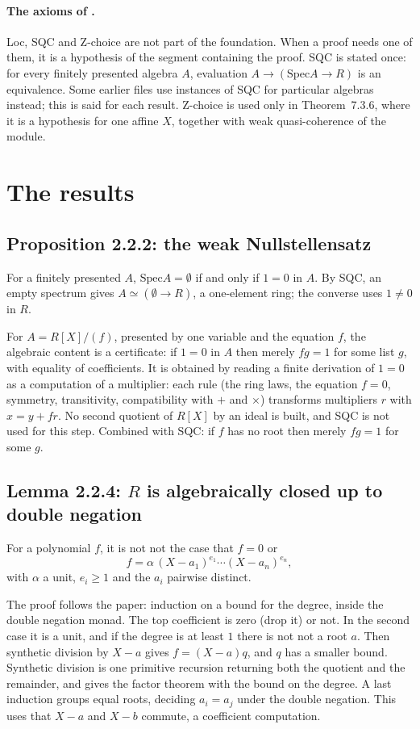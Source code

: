\documentclass[11pt]{article}
\newcommand{\Spec}{\mathrm{Spec}}
\theoremstyle{remark}
\begin{document}
\paragraph{The axioms of \cite{SAG}.} Loc, SQC and Z-choice are not
part of the foundation. When a proof needs one of them, it is a
hypothesis of the segment containing the proof. SQC is stated once: for
every finitely presented algebra $A$, evaluation
$A\to(\Spec A\to R)$ is an equivalence. Some earlier files use
instances of SQC for particular algebras instead; this is said for each
result. Z-choice is used only in Theorem~7.3.6, where it is a hypothesis
for one affine $X$, together with weak quasi-coherence of the module.

\section{The results}

\subsection*{Proposition 2.2.2: the weak Nullstellensatz}

For a finitely presented $A$, $\Spec A=\emptyset$ if and only if $1=0$
in $A$. By SQC, an empty spectrum gives $A\simeq(\emptyset\to R)$, a
one-element ring; the converse uses $1\ne0$ in $R$.

For $A=R[X]/(f)$, presented by one variable and the equation $f$, the
algebraic content is a certificate: if $1=0$ in $A$ then merely $fg=1$
for some list $g$, with equality of coefficients. It is obtained by
reading a finite derivation of $1=0$ as a computation of a multiplier:
each rule (the ring laws, the equation $f=0$, symmetry, transitivity,
compatibility with $+$ and $\times$) transforms multipliers $r$ with
$x=y+fr$. No second quotient of $R[X]$ by an ideal is built, and SQC is
not used for this step. Combined with SQC: if $f$ has no root then merely
$fg=1$ for some $g$.

\subsection*{Lemma 2.2.4: $R$ is algebraically closed up to double negation}

For a polynomial $f$, it is not not the case that $f = 0$ or
\[
  f = \alpha\,(X-a_1)^{e_1}\cdots(X-a_n)^{e_n},
\]
with $\alpha$ a unit, $e_i\ge 1$ and the $a_i$ pairwise distinct.

The proof follows the paper: induction on a bound for the degree, inside
the double negation monad. The top coefficient is zero (drop it) or not.
In the second case it is a unit, and if the degree is at least $1$ there
is not not a root $a$. Then synthetic division by $X-a$ gives $f=(X-a)q$,
and $q$ has a smaller bound. Synthetic division is one primitive
recursion returning both the quotient and the remainder, and gives the
factor theorem with the bound on the degree. A last induction groups
equal roots, deciding $a_i=a_j$ under the double negation. This uses
that $X-a$ and $X-b$ commute, a coefficient computation.
\end{document}
